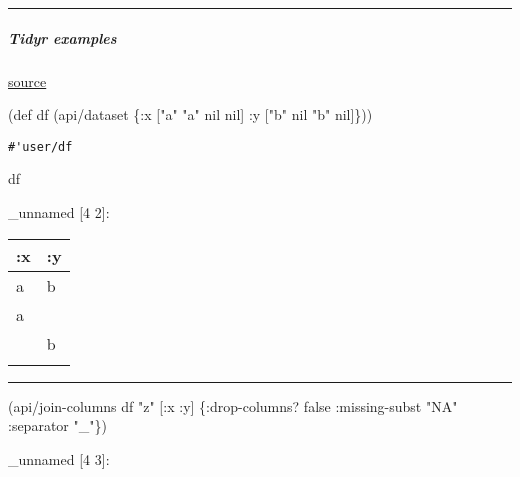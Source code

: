 \documentclass[]{article}
\newenvironment{Shaded}{\begin{snugshade}}{\end{snugshade}}
\newcommand{\StringTok}[1]{\textcolor[rgb]{0.31,0.60,0.02}{#1}}
\newcommand{\FunctionTok}[1]{\textcolor[rgb]{0.00,0.00,0.00}{#1}}
\newcommand{\VariableTok}[1]{\textcolor[rgb]{0.00,0.00,0.00}{#1}}
\newcommand{\BuiltInTok}[1]{#1}
\newcommand{\AttributeTok}[1]{\textcolor[rgb]{0.77,0.63,0.00}{#1}}
\newcommand{\NormalTok}[1]{#1}
\let\oldsubparagraph\subparagraph
\renewcommand{\subparagraph}[1]{\oldsubparagraph{#1}\mbox{}}
\begin{document}
\begin{center}\rule{0.5\linewidth}{0.5pt}\end{center}

\subparagraph{Tidyr examples}\label{tidyr-examples}

\href{https://tidyr.tidyverse.org/reference/unite.html}{source}

\begin{Shaded}
\begin{Highlighting}[]
\NormalTok{(}\BuiltInTok{def}\FunctionTok{ df }\NormalTok{(api/dataset \{}\AttributeTok{:x}\NormalTok{ [}\StringTok{"a"} \StringTok{"a"} \VariableTok{nil} \VariableTok{nil}\NormalTok{]}
                      \AttributeTok{:y}\NormalTok{ [}\StringTok{"b"} \VariableTok{nil} \StringTok{"b"} \VariableTok{nil}\NormalTok{]\}))}
\end{Highlighting}
\end{Shaded}

\begin{verbatim}
#'user/df
\end{verbatim}

\begin{Shaded}
\begin{Highlighting}[]
\NormalTok{df}
\end{Highlighting}
\end{Shaded}

\_unnamed {[}4 2{]}:

\begin{longtable}[]{@{}ll@{}}
\toprule
:x & :y\tabularnewline
\midrule
\endhead
a & b\tabularnewline
a &\tabularnewline
& b\tabularnewline
&\tabularnewline
\bottomrule
\end{longtable}

\begin{center}\rule{0.5\linewidth}{0.5pt}\end{center}

\begin{Shaded}
\begin{Highlighting}[]
\NormalTok{(api/join-columns df }\StringTok{"z"}\NormalTok{ [}\AttributeTok{:x} \AttributeTok{:y}\NormalTok{] \{}\AttributeTok{:drop-columns}\NormalTok{? }\VariableTok{false}
                                  \AttributeTok{:missing-subst} \StringTok{"NA"}
                                  \AttributeTok{:separator} \StringTok{"_"}\NormalTok{\})}
\end{Highlighting}
\end{Shaded}

\_unnamed {[}4 3{]}:
\end{document}
